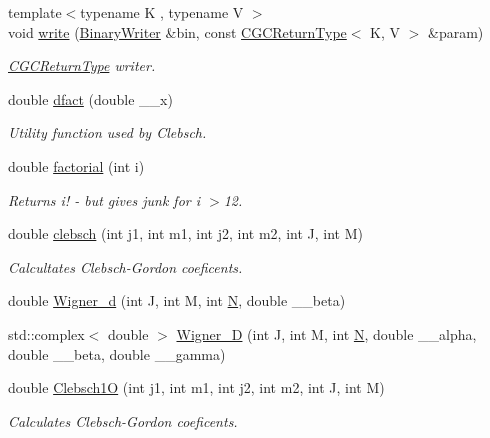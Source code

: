 \begin{DoxyCompactItemize}
{\footnotesize template$<$typename K , typename V $>$ }\\void \mbox{\hyperlink{namespaceHadron_a67e12d192d662851e588e9f3504ec45e}{write}} (\mbox{\hyperlink{classADATIO_1_1BinaryWriter}{Binary\+Writer}} \&bin, const \mbox{\hyperlink{structHadron_1_1CGCReturnType}{C\+G\+C\+Return\+Type}}$<$ K, V $>$ \&param)
\begin{DoxyCompactList}\small\item\em \mbox{\hyperlink{structHadron_1_1CGCReturnType}{C\+G\+C\+Return\+Type}} writer. \end{DoxyCompactList}\item 
double \mbox{\hyperlink{namespaceHadron_a5851b4dcb78567e53c44241a6db6c87e}{dfact}} (double \+\_\+\+\_\+x)
\begin{DoxyCompactList}\small\item\em Utility function used by Clebsch. \end{DoxyCompactList}\item 
double \mbox{\hyperlink{namespaceHadron_a0df3fb454ec05867e44777d4f5a6b7f7}{factorial}} (int i)
\begin{DoxyCompactList}\small\item\em Returns i! -\/ but gives junk for i $>$12. \end{DoxyCompactList}\item 
double \mbox{\hyperlink{namespaceHadron_ac4cba1d4aa3863fdc7991c208b3b9594}{clebsch}} (int j1, int m1, int j2, int m2, int J, int M)
\begin{DoxyCompactList}\small\item\em Calcultates Clebsch-\/\+Gordon coeficents. \end{DoxyCompactList}\item 
double \mbox{\hyperlink{namespaceHadron_a63c49af65c1d943a78205d3b8b63079a}{Wigner\+\_\+d}} (int J, int M, int \mbox{\hyperlink{adat__devel_2lib_2hadron_2operator__name__util_8cc_a7722c8ecbb62d99aee7ce68b1752f337}{N}}, double \+\_\+\+\_\+beta)
\item 
std\+::complex$<$ double $>$ \mbox{\hyperlink{namespaceHadron_a4d99a17c00bdddfc88a14c0571b74338}{Wigner\+\_\+D}} (int J, int M, int \mbox{\hyperlink{adat__devel_2lib_2hadron_2operator__name__util_8cc_a7722c8ecbb62d99aee7ce68b1752f337}{N}}, double \+\_\+\+\_\+alpha, double \+\_\+\+\_\+beta, double \+\_\+\+\_\+gamma)
\item 
double \mbox{\hyperlink{namespaceHadron_a78e0e843ad34636504d3ab3f2280e5e5}{Clebsch1O}} (int j1, int m1, int j2, int m2, int J, int M)
\begin{DoxyCompactList}\small\item\em Calculates Clebsch-\/\+Gordon coeficents. \end{DoxyCompactList}\item 

\end{DoxyCompactItemize}
